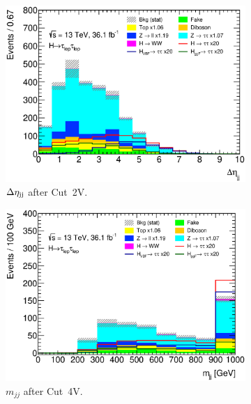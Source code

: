 \begin{figure}[htb]
\begin{subfigure}[t]{0.45\textwidth}
    \end{subfigure}
    \begin{subfigure}[t]{0.45\textwidth}
        \includegraphics[width=\textwidth]{./plots/event_selection/categories/ll-CutVBFCatOppositeHemispheres-DJetEta-lin.eps}
        \caption{$\Delta \eta_\text{jj}$ after Cut~2V.}\label{fig:event_selection:cutflow:vbf:detajj}
    \end{subfigure}
    \begin{subfigure}[t]{0.45\textwidth}
        \includegraphics[width=\textwidth]{./plots/event_selection/categories/ll-CutVBFCatLCentrality-Mjj-lin.eps}
        \caption{$m_{jj}$ after Cut~4V.}\label{fig:event_selection:cutflow:vbf:mjj}
    \end{subfigure}
    \begin{subfigure}[t]{0.45\textwidth}

\end{subfigure}
\end{figure}
